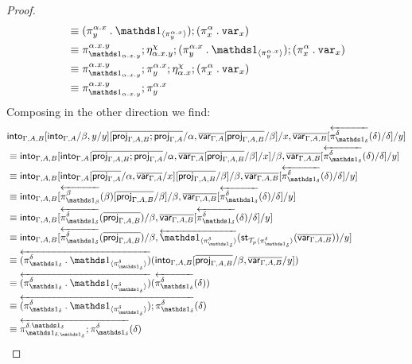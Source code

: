 \documentclass[10pt]{article}
\theoremstyle{definition}
\newcommand{\rewrite}[2]{\overleftarrow{#1}(#2)}
\newcommand\StI[2]{\ensuremath{\mathsf{st}_{#1}(#2)}}
\newcommand\ApEl[2]{\mathcal{T}_{#1}\langle#2\rangle}
\newcommand\bdot[0]{\mathbin{.}}
\begin{document}
\begin{proof}
\begin{align*}
&\equiv (\pi^{\alpha.x}_y \bdot \ApOne{\pi^{\alpha.x}_y});(\pi^\alpha_x \bdot \var{x}) \\
&\equiv \pi^{\alpha.x.y}_{\One_{\alpha.x.y}};\eta^\chi_{\alpha.x.y};(\pi^{\alpha.x}_y \bdot \ApOne{\pi^{\alpha.x}_y});(\pi^\alpha_x \bdot \var{x}) \\
&\equiv \pi^{\alpha.x.y}_{\One_{\alpha.x.y}};\pi^{\alpha.x}_y;\eta^\chi_{\alpha.x};(\pi^\alpha_x \bdot \var{x}) \\
&\equiv \pi^{\alpha.x.y}_{\One_{\alpha.x.y}};\pi^{\alpha.x}_y
\end{align*}
Composing in the other direction we find:
\begin{align*}
&\into{\Gamma, A, B}[\into{\Gamma, A}/\beta, y/y][\upstairs{\proj{\Gamma, A, B};\proj{\Gamma, A}}/\alpha, \upstairs{\qvar{\Gamma, A}}[\upstairs{\proj{\Gamma, A, B}}/\beta]/x, \upstairs{\qvar{\Gamma, A, B}}[\rewrite{\pi^\delta_{\One_\delta}}{\delta}/\delta]/y] \\
&\equiv \into{\Gamma, A, B}[\into{\Gamma, A}[\upstairs{\proj{\Gamma, A, B};\proj{\Gamma, A}}/\alpha, \upstairs{\qvar{\Gamma, A}}[\upstairs{\proj{\Gamma, A, B}}/\beta]/x] /\beta, \upstairs{\qvar{\Gamma, A, B}}[\rewrite{\pi^\delta_{\One_\delta}}{\delta}/\delta]/y] \\
&\equiv \into{\Gamma, A, B}[\into{\Gamma, A}[\upstairs{\proj{\Gamma, A}}/\alpha, \upstairs{\qvar{\Gamma, A}}/x][\upstairs{\proj{\Gamma, A, B}}/\beta]/\beta, \upstairs{\qvar{\Gamma, A, B}}[\rewrite{\pi^\delta_{\One_\delta}}{\delta}/\delta]/y] \\
&\equiv \into{\Gamma, A, B}[\rewrite{\pi^{\beta}_{\One_{\beta}}}{\beta}[\upstairs{\proj{\Gamma, A, B}}/\beta]/\beta, \upstairs{\qvar{\Gamma, A, B}}[\rewrite{\pi^\delta_{\One_\delta}}{\delta}/\delta]/y] \\
&\equiv \into{\Gamma, A, B}[\rewrite{\pi^{\delta}_{\One_{\delta}}}{\upstairs{\proj{\Gamma, A, B}}}/\beta, \upstairs{\qvar{\Gamma, A, B}}[\rewrite{\pi^\delta_{\One_\delta}}{\delta}/\delta]/y]\\
&\equiv \into{\Gamma, A, B}[\rewrite{\pi^{\delta}_{\One_{\delta}}}{\upstairs{\proj{\Gamma, A, B}}}/\beta, \rewrite{\ApOne{\pi^{\delta}_{\One_{\delta}}}}{\StI{\ApEl{p}{\pi^{\delta}_{\One_{\delta}}}}{\upstairs{\qvar{\Gamma, A, B}}}}/y]\\
&\equiv \rewrite{(\pi^{\delta}_{\One_{\delta}} \bdot \ApOne{\pi^{\delta}_{\One_{\delta}}})}{\into{\Gamma, A, B}[\upstairs{\proj{\Gamma, A, B}}/\beta, \upstairs{\qvar{\Gamma, A, B}}/y]}  \\
&\equiv \rewrite{(\pi^{\delta}_{\One_{\delta}} \bdot \ApOne{\pi^{\delta}_{\One_{\delta}}})}{\rewrite{\pi^{\delta}_{\One_{\delta}}}{\delta}}  \\
&\equiv \rewrite{(\pi^{\delta}_{\One_{\delta}} \bdot \ApOne{\pi^{\delta}_{\One_{\delta}}});\pi^{\delta}_{\One_{\delta}}}{\delta}  \\
&\equiv \rewrite{\pi^{\delta.\One_\delta}_{\One_{\delta.\One_\delta}};\pi^{\delta}_{\One_{\delta}}}{\delta}
\end{align*}
\end{proof}
\end{document}
